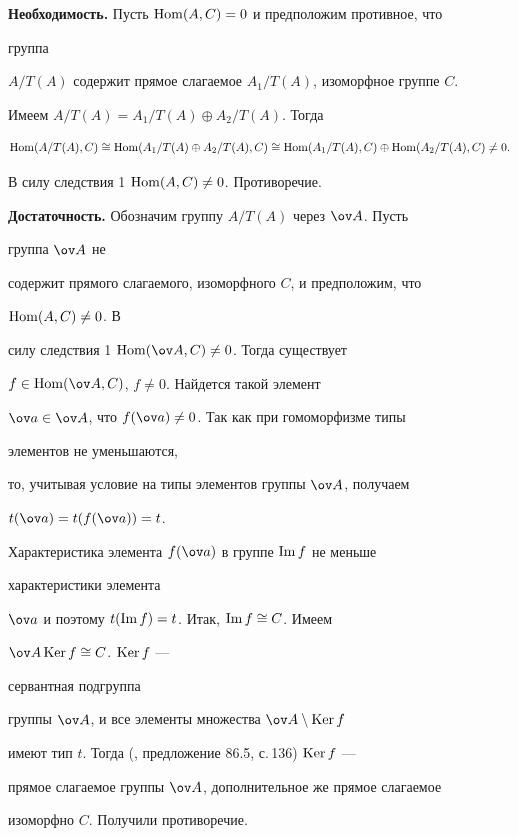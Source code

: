  


\begin{pf} 


{\bf Необходимость.} Пусть $\operatorname{Hom}(A,C)=0$ и предположим противное, что 


группа 


$A/T(A)$ содержит прямое слагаемое $A_1/T(A)$, изоморфное группе $C$. 


Имеем $A/T(A)=A_1/T(A)\oplus A_2/T(A)$. Тогда 


$$ 


\Hom(A/T(A),C)\cong\Hom(A_1/T(A)\oplus A_2/T(A),C)\cong 


\Hom(A_1/T(A),C)\oplus\Hom(A_2/T(A),C)\ne 0. 


$$ 


В силу следствия 1\; $\operatorname{Hom}(A,C)\ne0$. Противоречие. 


 


{\bf Достаточность.} Обозначим группу $A/T(A)$ через $\ov A$. Пусть 


группа $\ov A$ не 


содержит прямого слагаемого, изоморфного $C$, и предположим, что 


$\operatorname{Hom}(A,C)\ne0$. В 


силу следствия 1\; $\Hom(\ov A,C)\ne0$. Тогда существует 


$f\in\Hom(\ov A,C)$, $f\ne0$. Найдется такой элемент 


$\ov a\in\ov A$, что $f(\ov a)\ne0$. Так как при гомоморфизме типы 


элементов не уменьшаются, 


то, учитывая условие на типы элементов группы $\ov A$, получаем 


$t(\ov a)=t(f(\ov a))=t$. 


Характеристика элемента $f(\ov a)$ в группе $\operatorname{Im} f$ не меньше 


характеристики элемента 


$\ov a$ и поэтому $t(\operatorname{Im} f)=t$. Итак, $\operatorname{Im} f\cong C$. Имеем 


$\ov A\Ker f\cong C$.\; $\operatorname{Ker} f$ --- 


сервантная подгруппа 


группы $\ov A$, и все элементы множества $\ov A\setminus\Ker f$ 


имеют тип $t$. Тогда (\cite{4}, предложение 86.5, с.\,136) $\operatorname{Ker} f$ --- 


прямое слагаемое группы $\ov A$, дополнительное же прямое слагаемое 


изоморфно $C$. Получили противоречие. 


\end{pf} 



